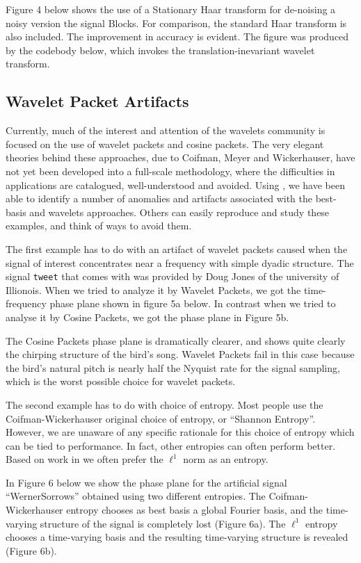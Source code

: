 Figure 4 below shows the use of a Stationary Haar transform
for de-noising a noisy version the signal Blocks. For comparison,
the standard Haar transform is also included.  
The improvement in accuracy is evident.
The figure was produced by the codebody below,
which invokes the translation-inevariant wavelet
transform.

\subsection{Wavelet Packet Artifacts}

Currently, much of the interest and attention
of the wavelets community is focused on the
use of wavelet packets and cosine packets.
The very elegant theories behind these approaches,
due to Coifman, Meyer and Wickerhauser,
have not yet been developed into a full-scale methodology,
where the difficulties in applications
are catalogued, well-understood and avoided.
Using \WaveLab,
we have been able to identify a number of anomalies and
artifacts associated with the best-basis and wavelets
approaches.  Others can easily reproduce and study these
examples, and think of ways to avoid them. 


The first example has to do with
an artifact of wavelet packets caused when the signal
of interest concentrates near a frequency with simple
 dyadic structure.  The signal {\tt tweet} that comes with \WaveLab
was provided by Doug Jones of the university of Illionois.
When we tried to analyze it by Wavelet Packets, we got the
time-frequency phase plane shown in figure 5a below.
In contrast when we tried to analyse it by Cosine Packets,
we got the phase plane in Figure 5b.

The Cosine Packets phase plane is dramatically clearer,
and shows quite clearly the chirping structure of the bird's
song.  Wavelet Packets fail in this case because the bird's
natural pitch is nearly half the Nyquist rate for the signal
sampling, which is the worst possible choice for wavelet packets.

The second example has to do with choice of entropy.
Most people use the Coifman-Wickerhauser original choice of entropy,
or ``Shannon Entropy''.  However, we are unaware
of any specific rationale for this choice
of entropy which can be tied to performance.
In fact, other entropies can often perform
better. Based on work in \cite{ChenDonoho}
we often prefer the $\ell^1$ norm as an entropy.

In Figure 6 below we show the phase plane for the artificial
signal ``WernerSorrows'' obtained using two different
entropies.  The Coifman-Wickerhauser entropy chooses
as best basis a global Fourier basis, and the time-varying
structure of the signal is completely lost (Figure 6a).  The $\ell^1$
entropy chooses a time-varying basis and the resulting
time-varying structure is revealed (Figure 6b).
 
